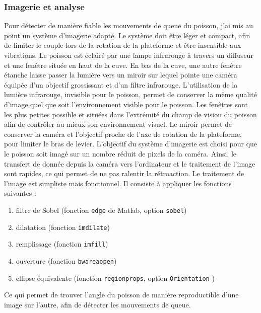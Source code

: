 \subsubsection{Imagerie et analyse}
Pour détecter de manière fiable les mouvements de queue du poisson, j'ai mis au point un système d'imagerie adapté. Le système doit être léger et compact, afin de limiter le couple lors de la rotation de la plateforme et être insensible aux vibrations. Le poisson est éclairé par une lampe infrarouge à travers un diffuseur et une fenêtre située en haut de la cuve. En bas de la cuve, une autre fenêtre étanche laisse passer la lumière vers un miroir sur lequel pointe une caméra équipée d'un objectif grossissant et d'un filtre infrarouge. L'utilisation de la lumière infrarouge, invisible pour le poisson, permet de conserver la même qualité d'image quel que soit l'environnement visible pour le poisson. Les fenêtres sont les plus petites possible et situées dans l'extrémité du champ de vision du poisson afin de contrôler au mieux son environnement visuel. Le miroir permet de conserver la caméra et l'objectif proche de l'axe de rotation de la plateforme, pour limiter le bras de levier.
L'objectif du système d'imagerie est choisi pour que le poisson soit imagé sur un nombre réduit de pixels de la caméra. Ainsi, le transfert de donnée depuis la caméra vers l'ordinateur et le traitement de l'image sont rapides, ce qui permet de ne pas ralentir la rétroaction. Le traitement de l'image est simpliste mais fonctionnel. Il consiste à appliquer les fonctions suivantes :

\begin{enumerate} \itemsep0em
    \item filtre de Sobel (fonction \verb|edge| de Matlab, option \verb|sobel|)
    \item dilatation (fonction \verb|imdilate|)
    \item remplissage (fonction \verb|imfill|)
    \item ouverture (fonction \verb|bwareaopen|)
    \item ellipse équivalente (fonction \verb|regionprops|, option \verb|Orientation| )
\end{enumerate}

Ce qui permet de trouver l'angle du poisson de manière reproductible d'une image sur l'autre, afin de détecter les mouvements de queue.

